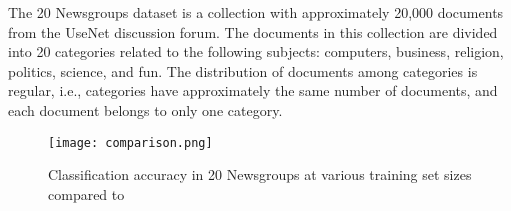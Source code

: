 The 20 Newsgroups dataset is a collection with approximately 20,000 documents from the UseNet discussion forum. The documents in this collection are divided into 20 categories related to the following subjects: computers, business, religion, politics, science, and fun. The distribution of documents among categories is regular, i.e., categories have approximately the same number of documents, and each document belongs to only one category.


\begin{figure}[H]
\centering
  \texttt{[image: comparison.png]}
  \caption{Classification accuracy in 20 Newsgroups at various training set sizes compared to \cite{schonhofen2009identifying} }
  \label{fig:example-comparison}
\end{figure}
